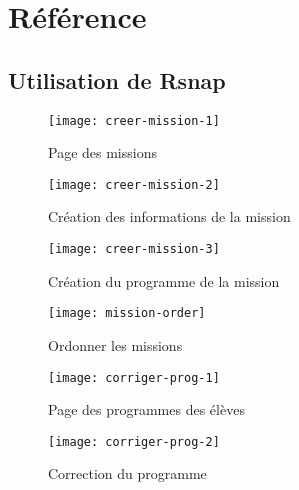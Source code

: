 \graphicspath{{content/11-reference/images/}}

\chapter{Référence}

\section{Utilisation de Rsnap}

\begin{figure}
  \begin{center}
    \texttt{[image: creer-mission-1]}
    \caption{Page des missions}
    \label{fig:creer-mission-1}
  \end{center}
\end{figure}
\begin{figure}
  \begin{center}
    \texttt{[image: creer-mission-2]}
    \caption{Création des informations de la mission}
    \label{fig:creer-mission-2}
  \end{center}
\end{figure}
\begin{figure}
  \begin{center}
    \texttt{[image: creer-mission-3]}
    \caption{Création du programme de la mission}
    \label{fig:creer-mission-3}
  \end{center}
\end{figure}

\begin{figure}
  \begin{center}
    \texttt{[image: mission-order]}
    \caption{Ordonner les missions}
    \label{fig:mission-order}
  \end{center}
\end{figure}

\begin{figure}
  \begin{center}
    \texttt{[image: corriger-prog-1]}
    \caption{Page des programmes des élèves}
    \label{fig:corriger-prog-1}
  \end{center}
\end{figure}
\begin{figure}
  \begin{center}
    \texttt{[image: corriger-prog-2]}
    \caption{Correction du programme}
    \label{fig:corriger-prog-2}
  \end{center}
\end{figure}

